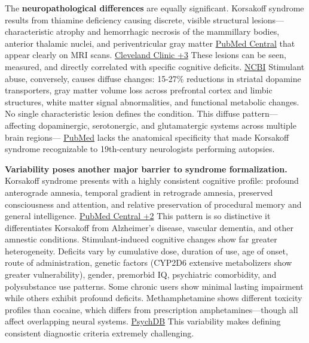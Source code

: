 The \textbf{neuropathological differences} are equally significant. Korsakoff syndrome results from thiamine deficiency causing discrete, visible structural lesions---characteristic atrophy and hemorrhagic necrosis of the mammillary bodies, anterior thalamic nuclei, and periventricular gray matter \href{https://pmc.ncbi.nlm.nih.gov/articles/PMC5708199/}{PubMed Central} that appear clearly on MRI scans. \href{https://my.clevelandclinic.org/health/diseases/22687-wernicke-korsakoff-syndrome}{Cleveland Clinic +3} These lesions can be seen, measured, and directly correlated with specific cognitive deficits. \href{https://www.ncbi.nlm.nih.gov/books/NBK430729/}{NCBI} Stimulant abuse, conversely, causes diffuse changes: 15-27\% reductions in striatal dopamine transporters, gray matter volume loss across prefrontal cortex and limbic structures, white matter signal abnormalities, and functional metabolic changes. No single characteristic lesion defines the condition. This diffuse pattern---affecting dopaminergic, serotonergic, and glutamatergic systems across multiple brain regions--- \href{https://pubmed.ncbi.nlm.nih.gov/15464128/}{PubMed} lacks the anatomical specificity that made Korsakoff syndrome recognizable to 19th-century neurologists performing autopsies.

\textbf{Variability poses another major barrier to syndrome formalization.} Korsakoff syndrome presents with a highly consistent cognitive profile: profound anterograde amnesia, temporal gradient in retrograde amnesia, preserved consciousness and attention, and relative preservation of procedural memory and general intelligence. \href{https://pmc.ncbi.nlm.nih.gov/articles/PMC5708199/}{PubMed Central +2} This pattern is so distinctive it differentiates Korsakoff from Alzheimer's disease, vascular dementia, and other amnestic conditions. Stimulant-induced cognitive changes show far greater heterogeneity. Deficits vary by cumulative dose, duration of use, age of onset, route of administration, genetic factors (CYP2D6 extensive metabolizers show greater vulnerability), gender, premorbid IQ, psychiatric comorbidity, and polysubstance use patterns. Some chronic users show minimal lasting impairment while others exhibit profound deficits. Methamphetamine shows different toxicity profiles than cocaine, which differs from prescription amphetamines---though all affect overlapping neural systems. \href{https://www.psychdb.com/addictions/stimulants/1-use-disorder}{PsychDB} This variability makes defining consistent diagnostic criteria extremely challenging.

